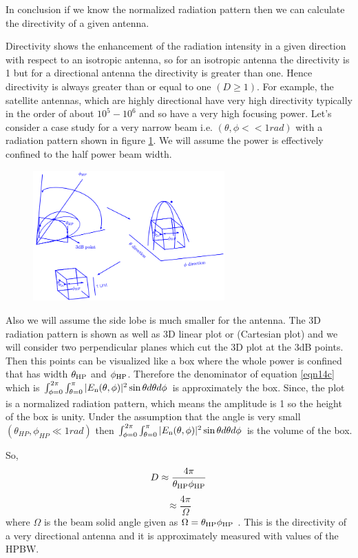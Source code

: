 \begin{enumerate}
In conclusion if we know the normalized radiation pattern then we can calculate the directivity of a given antenna.
		
Directivity shows the enhancement of the radiation intensity in a given direction with respect to an isotropic antenna, so for an isotropic antenna the directivity is 1 but for a directional antenna the directivity is greater than one. Hence directivity is always greater than or equal to one $(D\geq 1)$.
For example, the satellite antennas, which are highly directional have very high directivity typically in the order of about $10^{5}-10^{6}$ and so have a very high focusing power.	Let's consider a case study for a very narrow beam i.e. $(\theta, \phi << 1rad)$ with a radiation pattern shown in figure \ref{figure16}. We will assume the power is effectively confined to the half power beam width.  

\begin{figure}[h]
\centering
\includegraphics[height=5cm]{"./graphics/fig 16 lec 47"}
\label{figure16}
\end{figure}

Also we will assume the side lobe is much smaller for the antenna. The 3D radiation pattern is shown as well as 3D linear plot or (Cartesian plot) and we will consider two perpendicular planes which cut the 3D plot at the 3dB points. Then this points can be visualized like a box where the whole power is confined that has width $\theta_{\textnormal{HP}}$ and $\phi_{\textnormal{HP}}$. Therefore the denominator of equation \ref{eqn14c} which is $\int_{\phi=0}^{2\pi} \int_{\theta=0}^{\pi}|E_{\textnormal{n}}(\theta, \phi)|^{2}\sin\theta d\theta d\phi$ is approximately the box.
Since, the plot is a normalized radiation pattern, which means the amplitude is 1 so the height of the box is unity. Under the assumption that the angle is very small $(\theta_{HP}, \phi_{HP} \ll 1rad)$ then $\int_{\phi=0}^{2\pi} \int_{\theta=0}^{\pi}|E_{\textnormal{n}}(\theta, \phi)|^{2}\sin\theta d\theta d\phi$ is the volume of the box.

So, 
$$D \approx \dfrac{4\pi}{\theta_{\textnormal{HP}}\phi_{\textnormal{HP}}}$$
$$\approx \frac{4\pi}{\Omega}$$
where $\Omega$ is the beam solid angle given as $\Omega =\theta_{\textnormal{HP}}\phi_{\textnormal{HP}} $ .
This is the directivity of a very directional antenna and it is approximately measured with values of the HPBW.	
\end{enumerate}	
